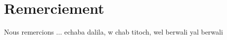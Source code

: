 
\chapter*{Remerciement} %

Nous remercions ... echaba dalila, w chab titoch, wel berwali yal berwali
